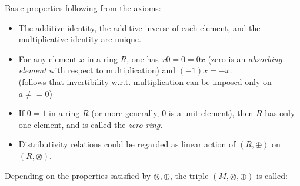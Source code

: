 \documentclass[a4paper,12pt]{scrartcl}    %
\newcommand{\OpA}{\otimes}
\newcommand{\OpB}{\oplus}
\begin{document}
\begin{landscape}
\begin{minipage}[c][\textheight]{0.50 \linewidth}
		Basic properties following from the axioms:
		\begin{itemize}
			\item The additive identity, the additive inverse of each element, and the multiplicative identity are unique.
			\item For any element $x$ in a ring $R$, one has $x 0 = 0 = 0x $ (zero is an \emph{absorbing element} with respect to multiplication) and $(-1)x = -x$.\\
			(follows that invertibility w.r.t. multiplication can be imposed only on $a \neq =0$)
			\item If $0 = 1$ in a ring $R$ (or more generally, 0 is a unit element), then $R$ has only one element, and is called the \emph{zero ring}.
			\item Distributivity relations could be regarded as linear action of $(R, \OpB)$ on $(R, \OpA)$.
		\end{itemize}
		
		
				Depending on the properties satisfied by $\OpA,\OpB$, the triple $(M,\OpA,\OpB)$ is called:

		\vfill
	\end{minipage}
	\hspace{1cm}
	\begin{minipage}[t][]{0.50 \linewidth}
	

\end{minipage}
\end{landscape}
\end{document}
